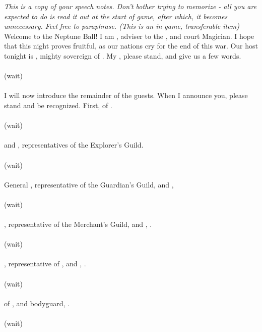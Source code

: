 \documentclass[white]{NeptuneBall}
\begin{document}
\name{\wSpeech{}}

\emph{This is a copy of your speech notes. Don't bother trying to memorize - all you are expected to do is read it out at the start of game, after which, it becomes unnecessary. Feel free to paraphrase. (This is an in game, transferable item)}\\

Welcome to the Neptune Ball! I am \cManta{}, adviser to the \cKing{\King}, and court Magician. I hope that this night proves fruitful, as our nations cry for the end of this war. Our host tonight is \cKing{\King} \cKing{}, mighty sovereign of \pAtlantis{}. My \cKing{\King}, please stand, and give us a few words.
\\ \\(wait)\\ \\
I will now introduce the remainder of the guests. When I announce you, please stand and be recognized. First, \cPrincess{\Prince} \cPrincess{} of \pAtlantis{}.
\\ \\(wait)\\ \\
\cPlant{\Prince} \cPlant{} and \cPriest{}, representatives of the Explorer's Guild.
\\ \\(wait)\\ \\
General \cGeneral{}, representative of the Guardian's Guild, and \cGeneral{\their} \cQueen{\spouse}, \cQueen{}
\\ \\(wait)\\ \\
\cSlave{}, representative of the Merchant's Guild, and \cSlave{\their} \cWitch{\sibling}, \cWitch{\MYname}.
\\ \\(wait)\\ \\
\cAriel{\King} \cAriel{}, representative of \pAmerica{}, and \cAriel{\their} \cWillow{\offspring}, \cWillow{}.
\\ \\(wait)\\ \\
\cPrince{\Prince} \cPrince{} of \pPacifica{}, and \cPrince{\their} bodyguard, \cBodyguard{}.
\\ \\(wait)\\ \\
\end{document}
